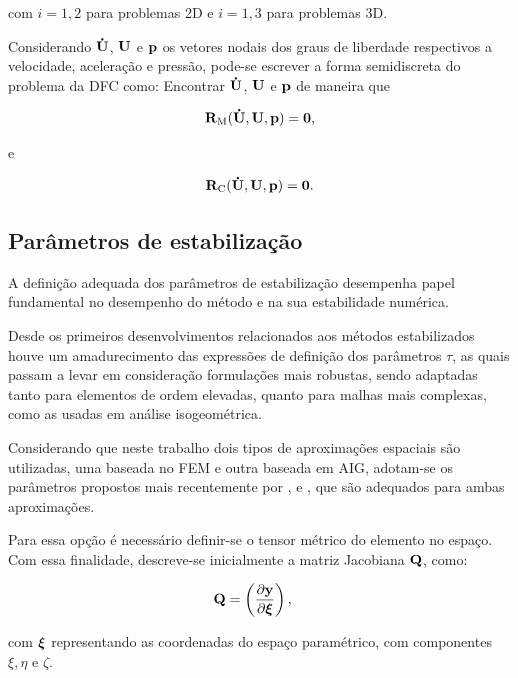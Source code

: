 \noindent com $i=1,2$ para problemas 2D e $i=1,3$ para problemas 3D.

Considerando $\mathbf{\dot{U}}$, $\mathbf{U}$ e $\mathbf{p}$ os vetores nodais dos graus de liberdade respectivos a velocidade, aceleração e pressão, pode-se escrever a forma semidiscreta do problema da DFC como: Encontrar $\mathbf{\dot{U}}$, $\mathbf{U}$ e $\mathbf{p}$ de maneira que

\begin{align}
	\mathbf{R}_\mathrm{M}(\mathbf{\dot{U}},\mathbf{U},\mathbf{p}) = \mathbf{0},\label{eq:resid_semi_discr_QM}
\end{align}

\noindent e

\begin{align}
	\mathbf{R}_\mathrm{C}(\mathbf{\dot{U}},\mathbf{U},\mathbf{p}) = \mathbf{0}. \label{eq:resid_semi_discr_C}
\end{align}

\subsection{Parâmetros de estabilização}\label{capitulo:Cap2:FormaFraca:taus}

A definição adequada dos parâmetros de estabilização desempenha papel fundamental no desempenho do método e na sua estabilidade numérica.

Desde os primeiros desenvolvimentos relacionados aos métodos estabilizados houve um amadurecimento das expressões de definição dos parâmetros $\tau$, as quais passam a levar em consideração formulações mais robustas, sendo adaptadas tanto para elementos de ordem elevadas, quanto para malhas mais complexas, como as usadas em análise isogeométrica.

Considerando que neste trabalho dois tipos de aproximações espaciais são utilizadas, uma baseada no FEM e outra baseada em AIG, adotam-se os parâmetros propostos mais recentemente por ,  e , que são adequados para ambas aproximações. 

Para essa opção é necessário definir-se o tensor métrico do elemento no espaço. Com essa finalidade, descreve-se inicialmente a matriz Jacobiana $\mathbf{Q}$, como:

\begin{align}
	\mathbf{Q}&=\left(\frac{\partial\mathbf{y}}{\partial\bm{\xi}}\right),
\end{align}

\noindent com $\bm{\xi}$ representando as coordenadas do espaço paramétrico, com componentes $\xi, \eta$ e $\zeta$.

